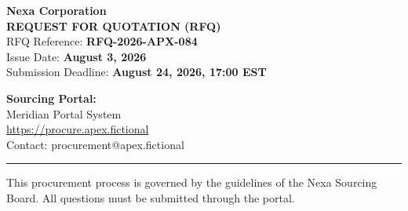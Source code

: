 \documentclass[11pt,a4paper]{article}
\begin{document}
\thispagestyle{empty}

\begin{minipage}[t]{0.6\textwidth}
    \vspace{0pt}
    {\color{primary}\Huge\bfseries Nexa Corporation} \\[0.15cm]
    {\color{secondary}\large\bfseries REQUEST FOR QUOTATION (RFQ)} \\[0.4cm]
    \textcolor{textmute}{\small 
        RFQ Reference: \textbf{RFQ-2026-APX-084} \\
        Issue Date: \textbf{August 3, 2026} \\
        Submission Deadline: \textbf{August 24, 2026, 17:00 EST}
    }
\end{minipage}%
\hfill
\begin{minipage}[t]{0.38\textwidth}
    \vspace{0pt}
    \begin{tcolorbox}[
        colback=lightbg,
        colframe=secondary,
        arc=4pt,
        boxrule=1.2pt,
        left=8pt, right=8pt, top=8pt, bottom=8pt
    ]
        \sffamily\small
        \textcolor{primary}{\bfseries Sourcing Portal:} \\
        Meridian Portal System \\
        \url{https://procure.apex.fictional} \\
        \vspace{0.1cm}
        \textcolor{textmute}{Contact: procurement@apex.fictional}
    \end{tcolorbox}
\end{minipage}

\vspace{0.5cm}
{\color{primary}\rule{\textwidth}{1.5pt}}
\vspace{0.5cm}



\newpage



\newpage




\vspace{0.8cm}
\begin{center}
    \textcolor{textmute}{\footnotesize This procurement process is governed by the guidelines of the Nexa Sourcing Board. All questions must be submitted through the portal.}
\end{center}

\vspace{0.6cm}


\end{document}
